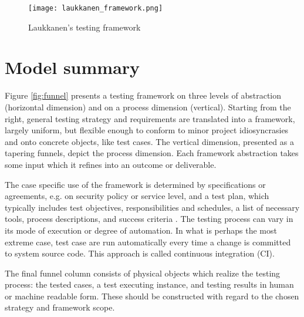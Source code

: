 \documentclass[12pt,a4paper,oneside,pdftex]{report}
\begin{document}
\begin{figure}[H]
  \begin{center}
    \texttt{[image: laukkanen\_framework.png]}
    \caption{Laukkanen's testing framework \citep{laukkanen2006data}}
    \label{fig:laukkanen} 
  \end{center}
\end{figure}

\section{Model summary}

Figure \ref{fig:funnel} presents a testing framework on three levels of abstraction (horizontal dimension) and on a process dimension (vertical). Starting from the right, general testing strategy and requirements are translated into a framework, largely uniform, but flexible enough to conform to minor project idiosyncrasies and onto concrete objects, like test cases. The vertical dimension, presented as a tapering funnels, depict the process dimension. Each framework abstraction takes some input which it refines into an outcome or deliverable.

The case specific use of the framework is determined by specifications or agreements, e.g. on security policy or service level, and a test plan, which typically includes test objectives, responsibilities and schedules, a list of necessary tools, process descriptions, and success criteria \citep{myers1976software}. The testing process can vary in its mode of execution or degree of automation. In what is perhaps the most extreme case, test case are run automatically every time a change is committed to system source code. This approach is called continuous integration (CI). 

The final funnel column consists of physical objects which realize the testing process: the tested cases, a test executing instance, and testing results in human or machine readable form. These should be constructed with regard to the chosen strategy and framework scope. 
\end{document}
